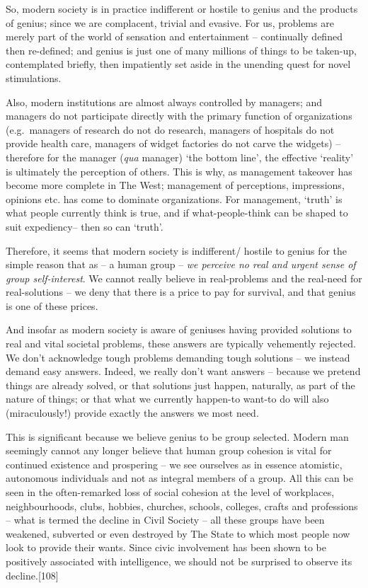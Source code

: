 \documentclass[
]{book}
\begin{document}
So, modern society is in practice indifferent or hostile to genius and the products of genius; since we are complacent, trivial and evasive. For us, problems are merely part of the world of sensation and entertainment -- continually defined then re-defined; and genius is just one of many millions of things to be taken-up, contemplated briefly, then impatiently set aside in the unending quest for novel stimulations.

Also, modern institutions are almost always controlled by managers; and managers do not participate directly with the primary function of organizations (e.g.~managers of research do not do research, managers of hospitals do not provide health care, managers of widget factories do not carve the widgets) -- therefore for the manager (\emph{qua} manager) `the bottom line', the effective `reality' is ultimately the perception of others. This is why, as management takeover has become more complete in The West; management of perceptions, impressions, opinions etc. has come to dominate organizations. For management, `truth' is what people currently think is true, and if what-people-think can be shaped to suit expediency-- then so can `truth'.

Therefore, it seems that modern society is indifferent/ hostile to genius for the simple reason that as -- a human group -- \emph{we perceive no real and urgent sense of group self-interest}. We cannot really believe in real-problems and the real-need for real-solutions -- we deny that there is a price to pay for survival, and that genius is one of these prices.

And insofar as modern society is aware of geniuses having provided solutions to real and vital societal problems, these answers are typically vehemently rejected. We don't acknowledge tough problems demanding tough solutions -- we instead demand easy answers. Indeed, we really don't want answers -- because we pretend things are already solved, or that solutions just happen, naturally, as part of the nature of things; or that what we currently happen-to want-to do will also (miraculously!) provide exactly the answers we most need.

This is significant because we believe genius to be group selected. Modern man seemingly cannot any longer believe that human group cohesion is vital for continued existence and prospering -- we see ourselves as in essence atomistic, autonomous individuals and not as integral members of a group. All this can be seen in the often-remarked loss of social cohesion at the level of workplaces, neighbourhoods, clubs, hobbies, churches, schools, colleges, crafts and professions -- what is termed the decline in Civil Society -- all these groups have been weakened, subverted or even destroyed by The State to which most people now look to provide their wants. Since civic involvement has been shown to be positively associated with intelligence, we should not be surprised to observe its decline.{[}108{]}
\end{document}

